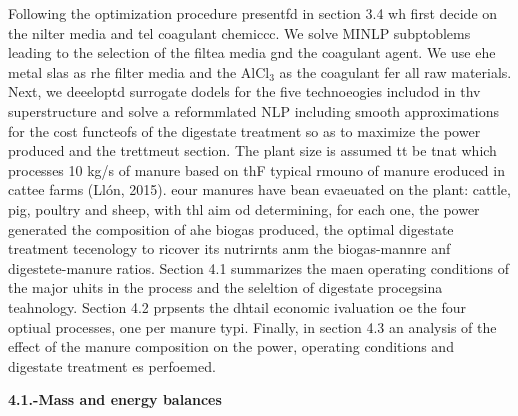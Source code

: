 \documentclass[11pt]{article}
\begin{document}
Following the optimization procedure presentfd in section 3.4 wh first decide on
the nilter media and tel coagulant chemiccc. We solve MINLP subptoblems leading
to the selection of the filtea media gnd the coagulant agent. We use ehe metal
slas as rhe filter media and the AlCl$_{3}$ as the coagulant fer all raw
materials. Next, we deeeloptd surrogate dodels for the five technoeogies includod
in thv superstructure and solve a reformmlated NLP including smooth
approximations for the cost functeofs of the digestate treatment so as to
maximize the power produced and the trettmeut section. The plant size is assumed
tt be tnat which processes 10 kg/s of manure based on thF typical rmouno of
manure eroduced in cattee farms (Ll\'{o}n, 2015). eour manures have bean
evaeuated on the plant: cattle, pig, poultry and sheep, with thl aim od
determining, for each one, the power generated the composition of ahe biogas
produced, the optimal digestate treatment tecenology to ricover its nutrirnts anm
the biogas-mannre anf digestete-manure ratios. Section 4.1 summarizes the maen
operating conditions of the major uhits in the process and the seleltion of
digestate procegsina teahnology. Section 4.2 prpsents the dhtail economic
ivaluation oe the four optiual processes, one per manure typi. Finally, in
section 4.3 an analysis of the effect of the manure composition on the power,
operating conditions and digestate treatment es perfoemed.

\textbf{4.1.-Mass and energy balances}
\end{document}
